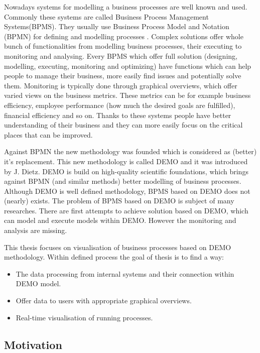 
Nowadays systems for modelling a business processes are well known and used. Commonly these systems are called Business Process Management Systems(BPMS). They usually use Business Process Model and Notation (BPMN) for defining and modelling processes . Complex solutions offer whole bunch of functionalities from modelling business processes, their executing to monitoring and analysing. Every BPMS which offer full solution (designing, modelling,  executing, monitoring and optimizing) have functions which can help people to manage their business, more easily find issues and potentially solve them.  Monitoring is typically done through graphical overviews, which offer varied views on the business metrics. These metrics can be for example business efficiency, employee performance (how much the desired goals are fulfilled), financial efficiency and so on. Thanks to these systems people have better understanding of their business and they can more easily focus on the critical places that can be improved.

Against BPMN the new methodology was founded which is considered as (better) it's replacement. This new methodology is called DEMO and it was introduced by J. Dietz. DEMO is build on high-quality scientific foundations, which brings against BPMN (and similar methods) better modelling of business processes.
Although DEMO is well defined methodology, BPMS based on DEMO does not (nearly) exists. The problem of BPMS based on DEMO is subject of many researches. There are first attempts to achieve solution based on DEMO, which can model and execute models within DEMO. However the monitoring and analysis are missing.

This thesis focuses on visualisation of business processes based on DEMO methodology. Within defined process the goal of thesis is to find a way:

\begin{itemize}
\item The data processing from internal systems and their connection within DEMO model. 
\item Offer data to users with appropriate graphical overviews.
\item Real-time visualisation of running processes.
\end{itemize}

\subsection{Motivation}

